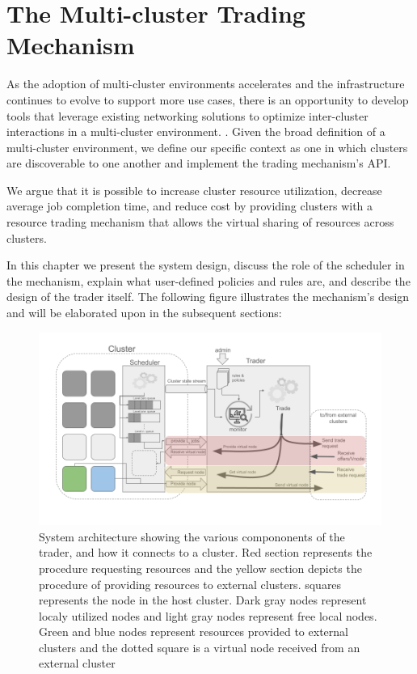 
\chapter{The Multi-cluster Trading Mechanism}

As the adoption of multi-cluster environments accelerates and the
infrastructure continues to evolve to support more use cases, there is an
opportunity to develop tools that leverage existing networking solutions to
optimize inter-cluster interactions in a multi-cluster environment. . Given the
broad definition of a multi-cluster environment, we define our specific context
as one in which clusters are discoverable to one another and implement the
trading mechanism's API.

We argue that it is possible to increase cluster resource utilization, decrease
average job completion time, and reduce cost by providing clusters with a
resource trading mechanism that allows the virtual sharing of resources across
clusters. 

In this chapter we present the system design, discuss the role of the scheduler
in the mechanism, explain what user-defined policies and rules are, and
describe the design of the trader itself. The following figure illustrates the
mechanism's design and will be elaborated upon in the subsequent sections: 

\begin{figure}[H]
  \centerline{\includegraphics[scale=0.45]{figures/system-diagram}}
  \caption{System architecture showing the various compononents of the trader,
    and how it connects to a cluster. Red section represents the procedure
    requesting resources and the yellow section depicts the procedure of
    providing resources to external clusters. squares represents the node in
    the host cluster. Dark gray nodes represent localy utilized nodes and light
    gray nodes represent free local nodes. Green and blue nodes represent
    resources    provided to external clusters and the dotted square is a
    virtual node received from an external cluster} 
\end{figure}

